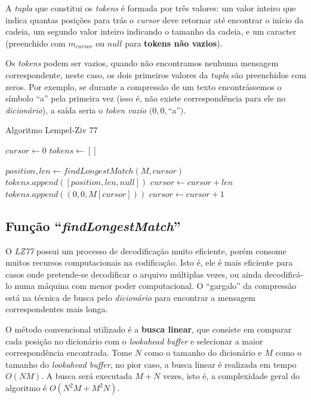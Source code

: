 A \emph{tupla} que constitui os \emph{tokens} é formada por três valores:
um valor inteiro que indica quantas posições para trás o \emph{cursor} deve retornar até encontrar o início da cadeia, 
um segundo valor inteiro indicando o tamanho da cadeia,
e um caracter (preenchido com $m_{cursor}$ ou $null$ para \textbf{tokens não vazios}).

Os \emph{tokens} podem ser vazios, quando não encontramos nenhuma mensagem correspondente, neste caso, os dois primeiros valores da \emph{tupla} são preenchidos com zeros.
Por exemplo, se durante a compressão de um texto encontrássemos o símbolo ``a'' pela primeira vez (isso é, não existe correspondência para ele no \emph{dicionário}), a saída seria o \emph{token vazio} $(0, 0, $``a''$)$.

\begin{algorithm}[H]
\caption{Algoritmo Lempel-Ziv 77} \label{alg:lz77}
\begin{algorithmic}

	\State $cursor \gets 0$
	\State $tokens \gets []$

		\State $position, len \gets findLongestMatch(M, cursor)$ 
		 
			\State $tokens.append([position, len, null])$
			\State $cursor \gets cursor + len$
		\Else
			\State $tokens.append((0, 0, M[cursor]))$ 
			\State $cursor \gets cursor + 1$
		\EndIf
	\EndWhile
\end{algorithmic}
\end{algorithm}

\subsection{Função ``\emph{findLongestMatch}'' }
O \emph{LZ77} possui um processo de decodificação muito eficiente, porém consome muitos recursos computacionais na codificação. 
Isto é, ele é mais eficiente para casos onde pretende-se decodificar o arquivo múltiplas vezes, ou ainda decodificá-lo numa máquina com menor poder computacional. 
O ``gargalo'' da compressão está na técnica de busca pelo \emph{dicionário} para encontrar a mensagem correspondentes mais longa.

O método convencional utilizado é a \textbf{busca linear}, que consiste em comparar cada posição no dicionário com o \emph{lookahead buffer} e selecionar a maior correspondência encontrada. 
Tome $N$ como o tamanho do dicionário e $M$ como o tamanho do \emph{lookahead buffer}, no pior caso, a busca linear é realizada em tempo $O(NM)$. 
A busca será executada $M + N$ vezes, isto é, a complexidade geral do algoritmo é $O( N^{2}M + M^{2}N)$.

